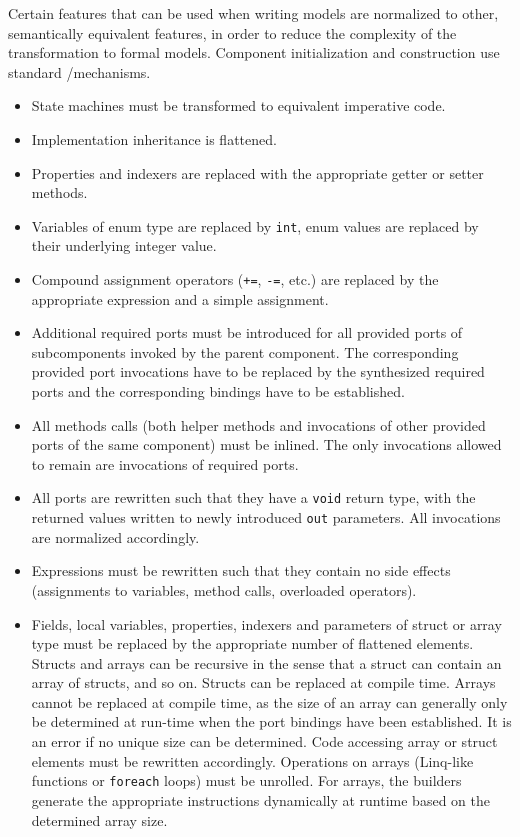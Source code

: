 \documentclass[a4paper,10pt,english]{article}
\begin{document}
Certain \CSharp features that can be used when writing \SSharp models are normalized to other, semantically equivalent
\CSharp features, in order to reduce the complexity of the transformation to formal models. Component initialization and
construction use standard \CSharp/\DotNet mechanisms.
\begin{itemize}
	\item State machines must be transformed to equivalent imperative code.
	\item Implementation inheritance is flattened. 
	\item Properties and indexers are replaced with the appropriate getter or setter methods.
	\item Variables of enum type are replaced by \texttt{int}, enum values are replaced by their underlying integer value.
	\item Compound assignment operators (\texttt{+=}, \texttt{-=}, etc.) are replaced by the appropriate expression and a simple
	assignment.
	\item Additional required ports must be introduced for all provided ports of subcomponents invoked by the parent component. The
	corresponding provided port invocations have to be replaced by the synthesized required ports and the corresponding bindings have
	to be established.
	\item All methods calls (both helper methods and invocations of other provided ports of the same component) must be inlined. The
	only invocations allowed to remain are invocations of required ports.
	\item All ports are rewritten such that they have a \texttt{void} return type, with the returned values written to newly
	introduced \texttt{out} parameters. All invocations are normalized accordingly.
	\item Expressions must be rewritten such that they contain no side effects (assignments to variables, method calls, overloaded
	operators).
	\item Fields, local variables, properties, indexers and parameters of struct or array type must be replaced by the appropriate
	number of flattened elements. Structs and arrays can be recursive in the sense that a struct can contain an array of structs,
	and so on. Structs can be replaced at compile time. Arrays cannot be replaced at compile time, as the size of an array can
	generally only be determined at run-time when the port bindings have been established. It is an error if no unique size can be
	determined. Code accessing array or struct elements must be rewritten accordingly. Operations on arrays (Linq-like functions or
	\texttt{foreach} loops) must be unrolled. For arrays, the builders generate the appropriate instructions dynamically at runtime
	based on the determined array size.
\end{itemize}
\end{document}
